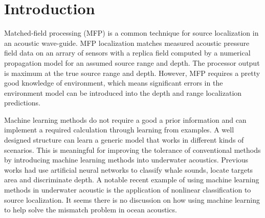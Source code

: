 \section{Introduction}
Matched-field processing (MFP) is a common technique for source localization in an acoustic
wave-guide\cite{bucker1976use,baggeroer1988matched,baggeroer1993overview}. 
MFP localization matches measured acoustic pressure field data on an arrary of sensors with a replica field computed by a numerical propagation model for an assumed source range and depth. The processor output is maximum at the true source range and depth. However, MFP requires a pretty good knowledge of environment, which means significant errors in the environment model can be introduced into the 
depth and range localization predictions.\cite{tolstoy1989sensitivity,del1988effects}

Machine learning methods do not require a good a prior information and can implement a required calculation through learning from examples. A well designed structure can learn a generic model that works in different kinds of scenarios. This is meaningful for improving the tolerance of conventional methods by introducing machine learning methods into underwater acoustics.
Previous works had use artificial neural networks to classify whale sounds\cite{thode2012automated}, locate targets\cite{steinberg1991neural} area and discriminate depth\cite{ozard1991artificial}. 
A notable recent example of using machine learning methods in underwater acoustic is the application of nonlinear classification to source localization\cite{niu2017source}. It seems there is no discussion on how using machine learning to help solve the mismatch problem in ocean acoustics.

